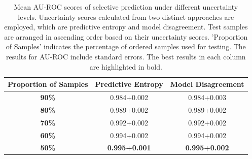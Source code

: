 \documentclass[10pt]{article} %
\begin{document}
\begin{table}[!htp]
\caption{Mean AU-ROC scores of selective prediction under different uncertainty levels. Uncertainty scores calculated from two distinct approaches are employed, which are predictive entropy and model disagreement. Test samples are arranged in ascending order based on their uncertainty scores. 'Proportion of Samples' indicates the percentage of ordered samples used for testing. The results for AU-ROC include standard errors. The best results in each column are highlighted in bold.}
\label{table: VIFA_uncertainty_auroc}
\begin{center}
\begin{tabular}{c|c|c}
\textbf{Proportion of Samples} & \textbf{Predictive Entropy} & \textbf{Model Disagreement} \\ \hline
\textbf{90\%}                               & 0.984+0.002                 & 0.984+0.003                 \\
\textbf{80\%}                               & 0.989+0.002                 & 0.989+0.002                 \\
\textbf{70\%}                               & 0.992+0.002                 & 0.992+0.002                 \\
\textbf{60\%}                               & 0.994+0.002                 & 0.994+0.002                 \\
\textbf{50\%}                               & \textbf{0.995+0.001}                 & \textbf{0.995+0.002}                
\end{tabular}
\end{center}
\end{table}
\end{document}
